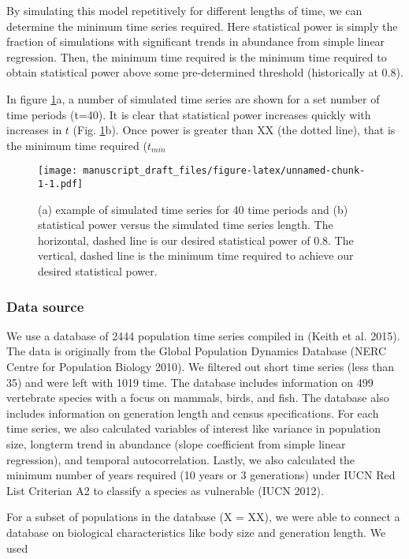 \documentclass[12pt,]{article}
\begin{document}
By simulating this model repetitively for different lengths of time, we
can determine the minimum time series required. Here statistical power
is simply the fraction of simulations with significant trends in
abundance from simple linear regression. Then, the minimum time required
is the minimum time required to obtain statistical power above some
pre-determined threshold (historically at 0.8).

In figure \ref{fig:theoretical_approach}a, a number of simulated time
series are shown for a set number of time periods (t=40). It is clear
that statistical power increases quickly with increases in \(t\) (Fig.
\ref{fig:theoretical_approach}b). Once power is greater than XX (the
dotted line), that is the minimum time required (\(t_{min}\)

\begin{figure}[htbp]
\centering
\texttt{[image: manuscript\_draft\_files/figure-latex/unnamed-chunk-1-1.pdf]}
\caption{(a) example of simulated time series for 40 time periods and
(b) statistical power versus the simulated time series length. The
horizontal, dashed line is our desired statistical power of 0.8. The
vertical, dashed line is the minimum time required to achieve our
desired statistical power.\label{fig:theoretical_approach}}
\end{figure}

\subsubsection{Data source}\label{data-source}

We use a database of 2444 population time series compiled in (Keith et
al. 2015). The data is originally from the Global Population Dynamics
Database (NERC Centre for Population Biology 2010). We filtered out
short time series (less than 35) and were left with 1019 time. The
database includes information on 499 vertebrate species with a focus on
mammals, birds, and fish. The database also includes information on
generation length and census specifications. For each time series, we
also calculated variables of interest like variance in population size,
longterm trend in abundance (slope coefficient from simple linear
regression), and temporal autocorrelation. Lastly, we also calculated
the minimum number of years required (10 years or 3 generations) under
IUCN Red List Criterian A2 to classify a species as vulnerable (IUCN
2012).

For a subset of populations in the database (X = XX), we were able to
connect a database on biological characteristics like body size and
generation length. We used
\end{document}
